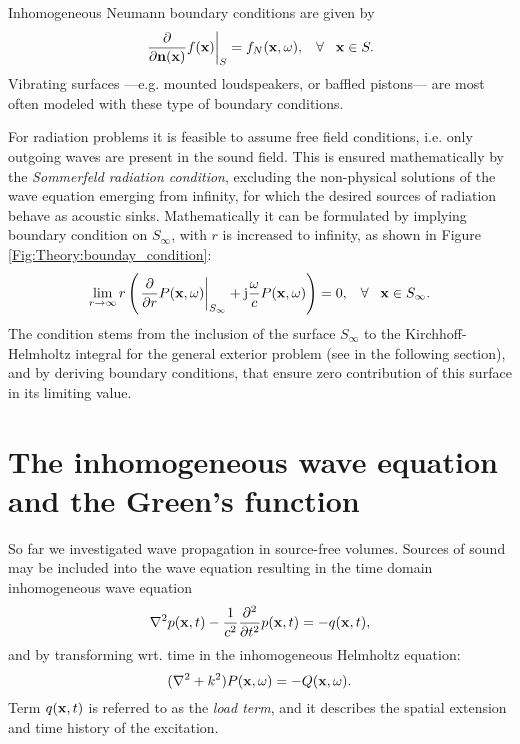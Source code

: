 \begin{itemize}
Inhomogeneous Neumann boundary conditions are given by
\begin{equation}
\left. \frac{\partial}{\partial \mathbf{n}(\mathbf{x})} f(\mathbf{x}) \right|_{S}= f_N(\mathbf{x},\omega), \hspace{3mm} \forall \hspace{3mm} \mathbf{x} \in S.
\end{equation}
Vibrating surfaces ---e.g. mounted loudspeakers, or baffled pistons--- are most often modeled with these type of boundary conditions.
\end{itemize}

For radiation problems it is feasible to assume free field conditions, i.e. only outgoing waves are present in the sound field. This is ensured mathematically by the \emph{Sommerfeld radiation condition}, excluding the non-physical solutions of the wave equation emerging from infinity, for which the desired sources of radiation behave as acoustic sinks.
Mathematically it can be formulated by implying boundary condition on $S_{\infty}$, with $r$ is increased to infinity, as shown in Figure \ref{Fig:Theory:bounday_condition}:
\begin{equation}
\lim_{r \rightarrow \infty} r \left( \left. \frac{\partial}{\partial r}P(\mathbf{x},\omega)\right|_{S_{\infty}} +\mathrm{j} \frac{\omega}{c}P(\mathbf{x},\omega) \right) = 0, \hspace{3mm} \forall \hspace{3mm} \mathbf{x} \in S_{\infty}.
\label{Eq:Theory:Sommerfeld_radiation_condition}
\end{equation}
The condition stems from the inclusion of the surface $S_{\infty}$ to the Kirchhoff-Helmholtz integral for the general exterior problem (see in the following section), and by deriving boundary conditions, that ensure zero contribution of this surface in its limiting value\cite{Schot1992:Eighty_years, Williams1999}.

\newpage
\section{The inhomogeneous wave equation and the Green's function}

So far we investigated wave propagation in source-free volumes. Sources of sound may be included into the wave equation resulting in the time domain inhomogeneous wave equation
\begin{equation}
\nabla^2 p(\mathbf{x},t) -\frac{1}{c^2}\frac{\partial^2}{\partial t^2}p(\mathbf{x},t) = -q(\mathbf{x},t),
\label{Eq:Theory:Inhomogene_wave_eq_time_domain}
\end{equation}
and by transforming wrt. time in the inhomogeneous Helmholtz equation:
\begin{equation}
(\nabla^2 + k^2 ) P(\mathbf{x},\omega ) = -Q(\mathbf{x},\omega).
\end{equation}
Term $q(\mathbf{x},t)$ is referred to as the \emph{load term}, and it describes the spatial extension and time history of the excitation.


